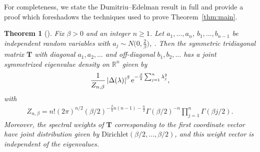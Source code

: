 \documentclass[pdftex]{sigma}
\numberwithin{equation}{section}
\newtheorem{Theorem}{Theorem}[section]
\theoremstyle{definition}
\newcommand{\R}{{\mathbb R}}
\newcommand{\mbf}[1]{\mathbf{#1}}
\begin{document}
For completeness, we state the Dumitriu--Edelman result in full and provide a proof which foreshadows the techniques used to prove Theorem~\ref{thm:main}.


\begin{Theorem}[\cite{DE}]\label{thm:DE}
Fix $\beta>0$ and an integer $n\ge 1$. Let $a_1,\dots, a_n$, $b_1, \dots, b_{n-1}$ be independent random variables with $a_j\sim N\bigl(0,\frac{2}{\beta}\bigr)$, . Then the symmetric tridiagonal matrix $\mbf{T}$ with diagonal $a_1,a_2,\dots$ and off-diagonal $b_1,b_2, \dots$ has a joint symmetrized eigenvalue density on $\R^n$ given by
\begin{align*}%
 \frac{1}{Z_{n,\beta}} \left|\Delta(\lambda)\right|^\beta {\rm e}^{-\frac{\beta}{4} \sum_{j=1}^n \lambda_j^2},
\end{align*}
with
\begin{align}\label{eq:GbE_constant}
 Z_{n,\beta}={n!} (2\pi)^{n/2} (\beta/2)^{-\frac{\beta}{4}n(n-1)-\frac{n}{2}} \Gamma(\beta/2)^{-n} \prod_{j=1}^n \Gamma(\beta j/2).
\end{align}
Moreover, the spectral weights of $\mbf{T}$ corresponding to the first coordinate vector have joint distribution given by $\mathrm{Dirichlet}(\beta/2,\dots, \beta/2)$, and this weight vector is independent of the eigenvalues.
\end{Theorem}
\end{document}
